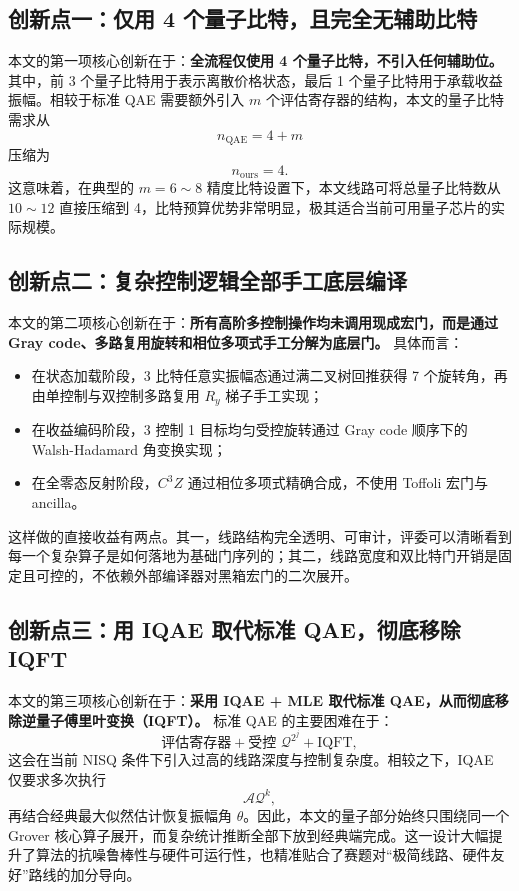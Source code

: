\documentclass[12pt,a4paper]{ctexart}
\begin{document}
\subsection{创新点一：仅用 4 个量子比特，且完全无辅助比特}
本文的第一项核心创新在于：\textbf{全流程仅使用 4 个量子比特，不引入任何辅助位。} 其中，前 3 个量子比特用于表示离散价格状态，最后 1 个量子比特用于承载收益振幅。相较于标准 QAE 需要额外引入 $m$ 个评估寄存器的结构，本文的量子比特需求从
\begin{equation}
n_{\mathrm{QAE}} = 4 + m
\end{equation}
压缩为
\begin{equation}
n_{\mathrm{ours}} = 4.
\end{equation}
这意味着，在典型的 $m=6\sim 8$ 精度比特设置下，本文线路可将总量子比特数从 $10\sim 12$ 直接压缩到 4，比特预算优势非常明显，极其适合当前可用量子芯片的实际规模。

\subsection{创新点二：复杂控制逻辑全部手工底层编译}
本文的第二项核心创新在于：\textbf{所有高阶多控制操作均未调用现成宏门，而是通过 Gray code、多路复用旋转和相位多项式手工分解为底层门。} 具体而言：
\begin{itemize}[leftmargin=2em]
\item 在状态加载阶段，3 比特任意实振幅态通过满二叉树回推获得 7 个旋转角，再由单控制与双控制多路复用 $R_y$ 梯子手工实现；
\item 在收益编码阶段，3 控制 1 目标均匀受控旋转通过 Gray code 顺序下的 Walsh-Hadamard 角变换实现；
\item 在全零态反射阶段，$C^3Z$ 通过相位多项式精确合成，不使用 Toffoli 宏门与 ancilla。
\end{itemize}
这样做的直接收益有两点。其一，线路结构完全透明、可审计，评委可以清晰看到每一个复杂算子是如何落地为基础门序列的；其二，线路宽度和双比特门开销是固定且可控的，不依赖外部编译器对黑箱宏门的二次展开。

\subsection{创新点三：用 IQAE 取代标准 QAE，彻底移除 IQFT}
本文的第三项核心创新在于：\textbf{采用 IQAE + MLE 取代标准 QAE，从而彻底移除逆量子傅里叶变换（IQFT）。} 标准 QAE 的主要困难在于：
\begin{equation}
\text{评估寄存器} + \text{受控 } \mathcal{Q}^{2^j} + \mathrm{IQFT},
\end{equation}
这会在当前 NISQ 条件下引入过高的线路深度与控制复杂度。相较之下，IQAE 仅要求多次执行
\begin{equation}
\mathcal{A}\mathcal{Q}^k,
\end{equation}
再结合经典最大似然估计恢复振幅角 $\theta$。因此，本文的量子部分始终只围绕同一个 Grover 核心算子展开，而复杂统计推断全部下放到经典端完成。这一设计大幅提升了算法的抗噪鲁棒性与硬件可运行性，也精准贴合了赛题对“极简线路、硬件友好”路线的加分导向。
\end{document}
